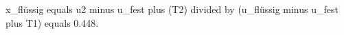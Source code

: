 x_flüssig equals u2 minus u_fest plus (T2) divided by (u_flüssig minus u_fest plus T1) equals 0.448.
